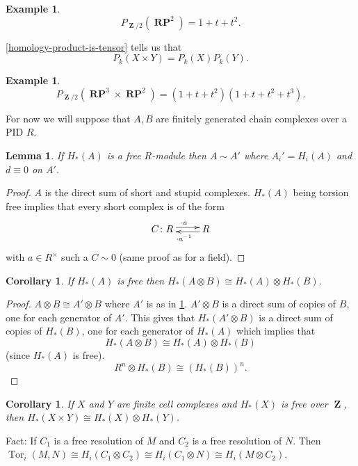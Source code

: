 \documentclass[10pt,]{book}
\theoremstyle{plain}
\newtheorem{corollary}[theorem]{Corollary}
\newtheorem{lemma}[theorem]{Lemma}
\theoremstyle{definition}
\newtheorem{example}[theorem]{Example}
\numberwithin{equation}{section}
\DeclareMathOperator{\Tor}{Tor}
\DeclareMathOperator{\ZZ}{\mathbf{Z}}
\DeclareMathOperator{\RP}{\mathbf{RP}}
\begin{document}
\begin{example}\label{example-24}
\[P_{\ZZ/2} (\RP^2) = 1 + t + t^2.\]\end{example}
\par
\ref{homology-product-is-tensor} tells us that \[P_k(X\times Y) = P_k(X)P_k(Y).\]%
\begin{example}\label{example-25}
\[P_{\ZZ/2}(\RP^3 \times \RP^2) = (1+t+t^2)(1+t+t^2+t^3).\]\end{example}
\par
For now we will suppose that \(A,B\) are finitely generated chain complexes over a PID \(R\).%
\begin{lemma}\label{free-homology-homotopic-zero-boundary}
If \(H_*(A)\) is a free \(R\)-module then \(A\sim A'\) where \(A_i' = H_i(A)\) and \(d\equiv 0\) on \(A'\).
          \end{lemma}
\begin{proof}
\(A\) is the direct sum of short and stupid complexes. \(H_*(A)\) being torsion free implies that every short complex is of the form
            \[
              \xymatrix{ C\colon R\ar@<.5ex>[r]^{\cdot a} & R \ar@<.5ex>[l]^{\cdot a^{-1}}}
            \]
            with \(a\in R^\times\) such a \(C \sim 0\) (same proof as for a field).
          \end{proof}
\begin{corollary}\label{corollary-8}
If \(H_*(A)\) is free then \(H_*(A\otimes B) \cong H_*(A) \otimes H_*(B)\).\end{corollary}
\begin{proof}
\(A\otimes B \cong A' \otimes B\) where \(A'\) is as in \ref{free-homology-homotopic-zero-boundary}.
            \(A'\otimes B\) is a direct sum of copies of \(B\), one for each generator of \(A'\).
            This gives that \(H_*(A'\otimes B)\) is  a direct sum of copies of \(H_*(B)\), one for each generator of \(H_*(A)\) which implies that
            \[H_*(A\otimes B) \cong H_*(A) \otimes H_*(B)\]
            (since \(H_*(A)\) is free).
            \[R^n \otimes H_*(B) \cong (H_*(B))^n.\]\end{proof}
\begin{corollary}\label{corollary-9}
If \(X\) and \(Y\) are finite cell complexes and \(H_*(X)\) is free over \(\ZZ\), then \(H_*(X\times Y) \cong H_*(X) \otimes H_*(Y)\).\end{corollary}
\par
Fact: If \(C_1\) is a free resolution of \(M\) and \(C_2\) is a free resolution of \(N\).
          Then \(\Tor_i(M,N) \cong H_i(C_1 \otimes C_2) \cong H_i(C_1 \otimes N) \cong H_i(M\otimes C_2)\).
\end{document}
